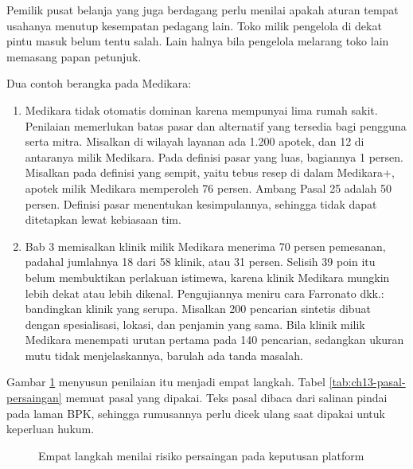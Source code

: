 Pemilik pusat belanja yang juga berdagang perlu menilai apakah aturan tempat usahanya menutup kesempatan pedagang lain. Toko milik pengelola di dekat pintu masuk belum tentu salah. Lain halnya bila pengelola
melarang toko lain memasang papan petunjuk.

Dua contoh berangka pada Medikara:
\begin{enumerate}
  \item Medikara tidak otomatis dominan karena mempunyai lima rumah sakit. Penilaian memerlukan batas pasar dan alternatif yang tersedia bagi pengguna serta mitra. Misalkan di wilayah layanan ada 1.200 apotek, dan 12
        di antaranya milik Medikara. Pada definisi pasar yang luas, bagiannya 1 persen. Misalkan pada definisi yang sempit, yaitu tebus resep di dalam Medikara+, apotek milik Medikara memperoleh 76 persen. Ambang
        Pasal 25 adalah 50 persen. Definisi pasar menentukan kesimpulannya, sehingga tidak dapat ditetapkan lewat kebiasaan tim.
  \item Bab 3 memisalkan klinik milik Medikara menerima 70 persen pemesanan, padahal jumlahnya 18 dari 58 klinik, atau 31 persen. Selisih 39 poin itu belum membuktikan perlakuan istimewa, karena klinik Medikara mungkin
        lebih dekat atau lebih dikenal. Pengujiannya meniru cara Farronato dkk.: bandingkan klinik yang serupa. Misalkan 200 pencarian sintetis dibuat dengan spesialisasi, lokasi, dan penjamin yang sama. Bila klinik
        milik Medikara menempati urutan pertama pada 140 pencarian, sedangkan ukuran mutu tidak menjelaskannya, barulah ada tanda masalah.
\end{enumerate}

Gambar \ref{fig:ch13-uji-persaingan} menyusun penilaian itu menjadi empat langkah. Tabel \ref{tab:ch13-pasal-persaingan} memuat pasal yang dipakai. Teks pasal dibaca dari salinan pindai pada laman BPK, sehingga
rumusannya perlu dicek ulang saat dipakai untuk keperluan hukum.

\begin{figure}[!htb]
  \centering
  
  \caption{Empat langkah menilai risiko persaingan pada keputusan platform}
  \label{fig:ch13-uji-persaingan}
\end{figure}

